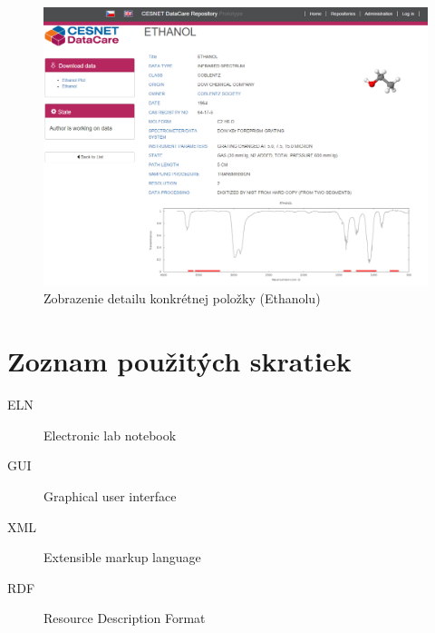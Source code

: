 \documentclass[thesis=M,slovak]{FITthesis}[2013/05/06]
\begin{document}
\begin{figure}\centering
	\includegraphics[width=1.0\textwidth]{grafika/detail_Ethanol.png}
 	\caption[Zobrazenie detailu konkrétnej položky (Ethanolu)]{Zobrazenie detailu konkrétnej položky (Ethanolu)}\label{graphics:Ethanol}
\end{figure}


\begin{conclusion}
\end{conclusion}




\appendix

\chapter{Zoznam použitých skratiek}
\begin{description}
	\item[ELN] Electronic lab notebook
	\item[GUI] Graphical user interface
	\item[XML] Extensible markup language
	\item[RDF] Resource Description Format
\end{description}
\end{document}
